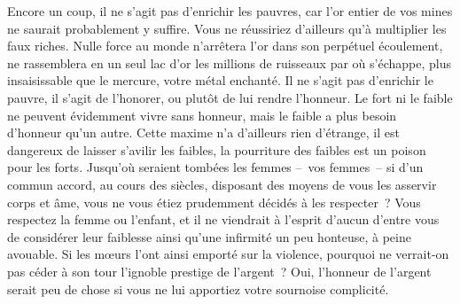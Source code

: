 \documentclass[french,twoside]{book} %
\newcommand{\astertri}{\medskip\par\centerline{\color{rubric}\large\selectfont{\syms ✻\,✻\,✻}}\medskip\par}%
\begin{document}
Encore un coup, il ne s’agit pas d’enrichir les pauvres, car l’or entier de vos mines ne saurait probablement y suffire. Vous ne réussiriez d’ailleurs qu’à multiplier les faux riches. Nulle force au monde n’arrêtera l’or dans son perpétuel écoulement, ne rassemblera en un seul lac d’or les millions de ruisseaux par où s’échappe, plus insaisissable que le mercure, votre métal enchanté. Il ne s’agit pas d’enrichir le pauvre, il s’agit de l’honorer, ou plutôt de lui rendre l’honneur. Le fort ni le faible ne peuvent évidemment vivre sans honneur, mais le faible a plus besoin d’honneur qu’un autre. Cette maxime n’a d’ailleurs rien d’étrange, il est dangereux de laisser s’avilir les faibles, la pourriture des faibles est un poison pour les forts. Jusqu’où seraient tombées les femmes – vos femmes – si d’un commun accord, au cours des siècles, disposant des moyens de vous les asservir corps et âme, vous ne vous étiez prudemment décidés à les respecter ? Vous respectez la femme ou l’enfant, et il ne viendrait à l’esprit d’aucun d’entre vous de considérer leur faiblesse ainsi qu’une infirmité un peu honteuse, à peine avouable. Si les mœurs l’ont ainsi emporté sur la violence, pourquoi ne verrait-on pas céder à son tour l’ignoble prestige de l’argent ? Oui, l’honneur de l’argent serait peu de chose si vous ne lui apportiez votre sournoise complicité.\par

\astertri
\end{document}
